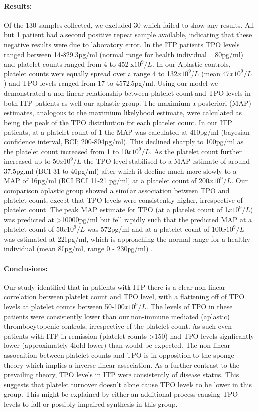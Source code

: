 \documentclass[11pt]{article}
\begin{document}
\paragraph{Results:} Of the 130 samples collected, we excluded 30 which failed to show any results. All but 1 patient had a second positive repeat sample available, indicating that these negative results were due to laboratory error. In the ITP patients TPO levels ranged between 14-829.3pg/ml (normal range for health individual ~ 80pg/ml) and platelet counts ranged from 4 to 452 x$10^9/L$. In our Aplastic controls, platelet counts were equally spread over a range 4 to 132$x10^9/L$ (mean 47$x10^9/L$) and TPO levels ranged from 17 to 4572.5pg/ml. Using our model we demonstrated a non-linear relationship between platelet count and TPO levels in both ITP patients as well our aplastic group. The maximium a posteriori (MAP) estimates, analogous to the maximium likelyhood estimate, were calculated as being the peak of the TPO distribution for each platelet count. In our ITP patients, at a platelet count of 1 the MAP was calculated at 410pg/ml (bayesian confidence interval, BCI; 200-804pg/ml). This declined sharply to 100pg/ml as the platelet count increased from 1 to 10$x10^9/L$. As the platelet count further increased up to 50$x10^9/L$ the TPO level stabilised to a MAP estimate of around 37.5pg.ml (BCI 31 to 46pg/ml) after which it decline much more slowly to a MAP of 16pg/ml (BCI BCI 11-21 pg/ml) at a platelet count of 200$x10^9/L$. Our comparison aplastic group showed a similar association between TPO and platelet count, except that TPO levels were consistently higher, irrespective of platelet count. The peak MAP estimate for TPO (at a platelet count of 1$x10^9/L$) was predicted at >10000pg/ml but fell rapidly such that the predicted MAP at a platelet count of 50$x10^9/L$ was 572pg/ml and at a platelet count of 100$x10^9/L$ was estimated at 221pg/ml, which is approaching the normal range for a healthy individual (mean 80pg/ml, range 0 - 230pg/ml) \cite{SinghCirculatingthrombopoietinlevels2015}.

\paragraph{Conclusions:} Our study identified that in patients with ITP there is a clear non-linear correlation between platelet count and TPO level, with a flattening off of TPO levels at platelet counts between 50-100$x10^9/L$. The levels of TPO in these patients were consistently lower than our non-immune mediated (aplastic) thrombocytopenic controls, irrespective of the platelet count. As such even patients with ITP in remission (platelet counts >150) had TPO levels signficantly lower (approximately 4fold lower) than would be expected. The non-linear assocaition between platelet counts and TPO is in opposition to the sponge theory which implies a inverse linear association. As a further contrast to the prevailing theory, TPO levels in ITP were consistently of disease status. This suggests that platelet turnover doesn't alone cause TPO levels to be lower in this group. This might be explained by either an additional process causing TPO levels to fall or possibly impaired synthesis in this group.
\end{document}
